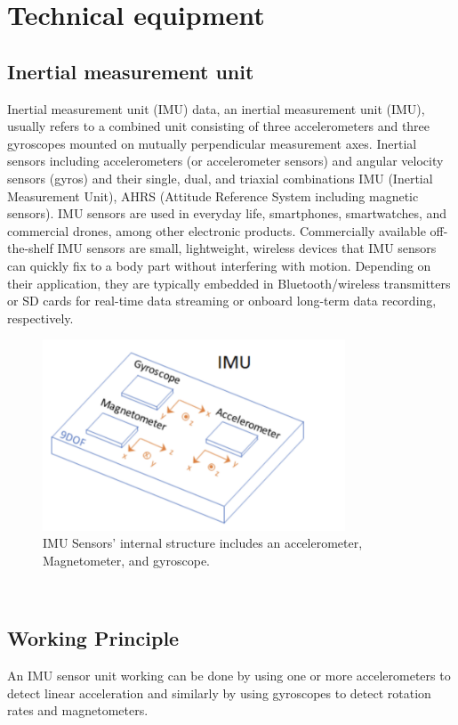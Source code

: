 \chapter{Technical equipment}

\section{Inertial measurement unit}
Inertial measurement unit (IMU) data, an inertial measurement unit (IMU), usually refers to a combined unit consisting of three accelerometers and three gyroscopes mounted on mutually perpendicular measurement axes.\cite{iosa2016wearable} Inertial sensors including accelerometers (or accelerometer sensors) and angular velocity sensors (gyros) and their single, dual, and triaxial combinations IMU (Inertial Measurement Unit), AHRS (Attitude Reference System including magnetic sensors). IMU sensors are used in everyday life, smartphones, smartwatches, and commercial drones, among other electronic products. Commercially available off-the-shelf IMU sensors are small, lightweight, wireless devices that IMU sensors can quickly fix to a body part without interfering with motion. Depending on their application, they are typically embedded in Bluetooth/wireless transmitters or SD cards for real-time data streaming or onboard long-term data recording, respectively.
\begin{figure}[htbp]
\centering
\includegraphics[width=9cm]{report/pics/IMU Sensor .png}
\caption{IMU Sensors' internal structure includes an accelerometer, Magnetometer, and gyroscope.\cite{IMU} }
\end{figure}\\
\section{Working Principle}
 An IMU sensor unit working can be done by using one or more accelerometers to detect linear acceleration and similarly by using gyroscopes to detect rotation rates and magnetometers. \cite{hazry2009study}
 
